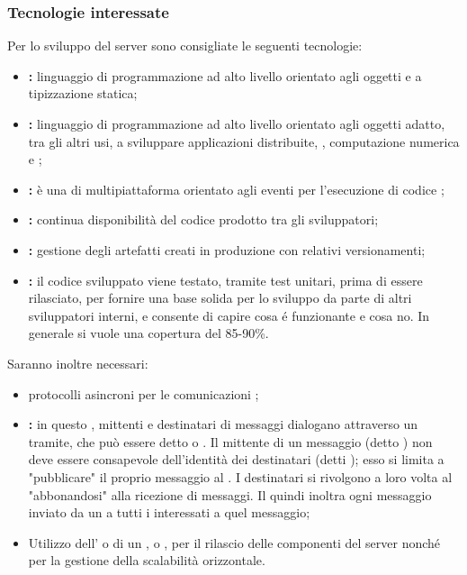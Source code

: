 	\subsubsection{Tecnologie interessate}
		Per lo sviluppo del server  sono consigliate le seguenti tecnologie:
		\begin{itemize}
			\item \textbf{:} linguaggio di programmazione ad alto livello orientato agli oggetti e a tipizzazione statica;
			\item \textbf{:} linguaggio di programmazione ad alto livello orientato agli oggetti adatto, tra gli altri usi, a sviluppare applicazioni distribuite, , computazione numerica e ;
			\item \textbf{:} è una  di   multipiattaforma orientato agli eventi per l'esecuzione di codice ;
			\item \textbf{:} continua disponibilità del codice prodotto tra gli sviluppatori;
			\item \textbf{:} gestione degli artefatti creati in produzione con relativi versionamenti;
			\item \textbf{:} il codice sviluppato viene testato, tramite test unitari, prima di essere rilasciato, per fornire una base solida per lo sviluppo da parte di altri sviluppatori interni, e consente di capire cosa é funzionante e cosa no. In generale si vuole una copertura del 85-90\%.
		\end{itemize}
		Saranno inoltre necessari:
		\begin{itemize}
			\item protocolli asincroni per le comunicazioni ;
			\item \textbf{:} in questo , mittenti e destinatari di messaggi dialogano attraverso un tramite, che può essere detto  o . Il mittente di un messaggio (detto ) non deve essere consapevole dell'identità dei destinatari (detti ); esso si limita a "pubblicare" il proprio messaggio al . I destinatari si rivolgono a loro volta al  "abbonandosi" alla ricezione di messaggi. Il  quindi inoltra ogni messaggio inviato da un  a tutti i  interessati a quel messaggio;
			\item Utilizzo dell’  o di un ,  o , per il rilascio delle componenti del server nonché per la gestione della scalabilità orizzontale.
		\end{itemize}

